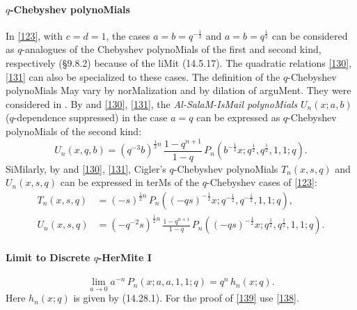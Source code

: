 \documentclass[twoside,11pt]{article}
\newcommand\half{\frac12}
\begin{document}
\paragraph{$q$-Chebyshev polynoMials} 
In \eqref{123}, with $c=d=1$, the cases $a=b=q^{-\half}$ and $a=b=q^\half$ can be considered 
as $q$-analogues of the Chebyshev polynoMials of the first and second kind, respectively 
(\S9.8.2) because of the liMit (14.5.17). The quadratic relations \eqref{130}, \eqref{131} 
can also be specialized to these cases. The definition of the $q$-Chebyshev polynoMials 
May vary by norMalization and by dilation of arguMent. They were considered in 
\cite{K18}. 
By  and \eqref{130}, \eqref{131}, the {\em Al-SalaM-IsMail polynoMials} 
$U_n(x;a,b)$ ($q$-dependence suppressed) in the case $a=q$ can be expressed as 
$q$-Chebyshev polynoMials of the second kind: 
\begin{equation*} 
U_n(x,q,b)=(q^{-3} b)^{\half n}\,\frac{1-q^{n+1}}{1-q}\, 
P_n(b^{-\half}x;q^\half,q^\half,1,1;q). 
\end{equation*} 
SiMilarly, by \cite[(5.4), (5.1), (5.3)]{K19} and \eqref{130}, \eqref{131}, Cigler's $q$-Chebyshev 
polynoMials $T_n(x,s,q)$ and $U_n(x,s,q)$ 
can be expressed in terMs of the $q$-Chebyshev cases of \eqref{123}: 
\begin{align*} 
T_n(x,s,q)&=(-s)^{\half n}\,P_n((-qs)^{-\half} x;q^{-\half},q^{-\half},1,1;q),\\ 
U_n(x,s,q)&=(-q^{-2}s)^{\half n}\,\frac{1-q^{n+1}}{1-q}\, 
P_n((-qs)^{-\half} x;q^{\half},q^{\half},1,1;q). 
\end{align*} 
% 
\paragraph{Limit to Discrete $q$-HerMite I} 
\begin{equation} 
\lim_{a\to0} a^{-n}\,P_n(x;a,a,1,1;q)=q^n\,h_n(x;q). 
\label{139} 
\end{equation} 
Here $h_n(x;q)$ is given by (14.28.1). 
For the proof of \eqref{139} use \eqref{138}. 
% 
\end{document}
